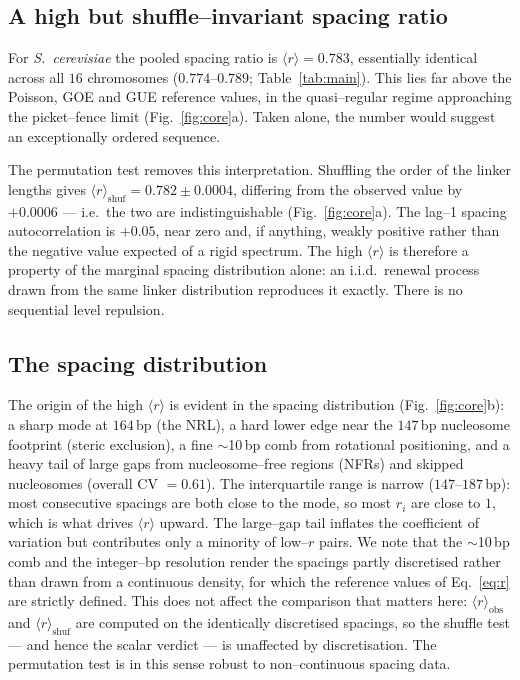 \documentclass[11pt]{article}
\renewcommand{\r}{\langle r\rangle}
\begin{document}
\subsection{A high but shuffle--invariant spacing ratio}

For \textit{S.\ cerevisiae} the pooled spacing ratio is $\r=0.783$, essentially
identical across all $16$ chromosomes ($0.774$--$0.789$; Table~\ref{tab:main}).
This lies far above the Poisson, GOE and GUE reference values, in the
quasi--regular regime approaching the picket--fence limit
(Fig.~\ref{fig:core}a). Taken alone, the number would suggest an exceptionally
ordered sequence.

The permutation test removes this interpretation. Shuffling the order of the
linker lengths gives $\r_{\mathrm{shuf}}=0.782\pm0.0004$, differing from the
observed value by $+0.0006$ --- i.e.\ the two are indistinguishable
(Fig.~\ref{fig:core}a). The lag--1 spacing autocorrelation is $+0.05$, near zero
and, if anything, weakly positive rather than the negative value expected of a
rigid spectrum. The high $\r$ is therefore a property of the marginal spacing
distribution alone: an i.i.d.\ renewal process drawn from the same linker
distribution reproduces it exactly. There is no sequential level repulsion.

\subsection{The spacing distribution}

The origin of the high $\r$ is evident in the spacing distribution
(Fig.~\ref{fig:core}b): a sharp mode at $164$\,bp (the NRL), a hard lower edge
near the $147$\,bp nucleosome footprint (steric exclusion), a fine $\sim$10\,bp
comb from rotational positioning, and a heavy tail of large gaps from
nucleosome--free regions (NFRs) and skipped nucleosomes (overall CV $=0.61$).
The interquartile range is narrow ($147$--$187$\,bp): most consecutive spacings
are both close to the mode, so most $r_i$ are close to $1$, which is what drives
$\r$ upward. The large--gap tail inflates the coefficient of variation but
contributes only a minority of low--$r$ pairs. We note that the $\sim$10\,bp comb
and the integer--bp resolution render the spacings partly discretised rather than
drawn from a continuous density, for which the reference values of
Eq.~\eqref{eq:r} are strictly defined. This does not affect the comparison that
matters here: $\r_{\mathrm{obs}}$ and $\r_{\mathrm{shuf}}$ are computed on the
identically discretised spacings, so the shuffle test --- and hence the scalar
verdict --- is unaffected by discretisation. The permutation test is in this
sense robust to non--continuous spacing data.
\end{document}
